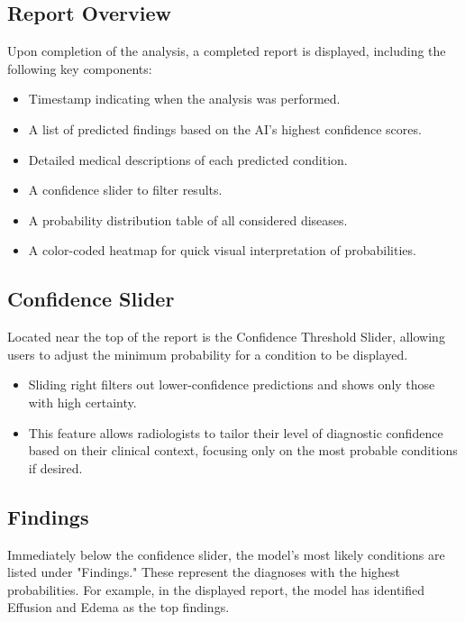 \documentclass[12pt]{article}
\begin{document}
\subsection{Report Overview}

Upon completion of the analysis, a completed report is displayed, including the following key components:

\begin{itemize}
    \item Timestamp indicating when the analysis was performed.
    \item A list of predicted findings based on the AI's highest confidence scores.
    \item Detailed medical descriptions of each predicted condition.
    \item A confidence slider to filter results.
    \item A probability distribution table of all considered diseases.
    \item A color-coded heatmap for quick visual interpretation of probabilities.
\end{itemize}

\subsection{Confidence Slider}

Located near the top of the report is the Confidence Threshold Slider, allowing users to adjust the minimum probability for a condition to be displayed.

\begin{itemize}
    \item Sliding right filters out lower-confidence predictions and shows only those with high certainty.
    \item This feature allows radiologists to tailor their level of diagnostic confidence based on their clinical context, focusing only on the most probable conditions if desired.
\end{itemize}

\subsection{Findings}

Immediately below the confidence slider, the model's most likely conditions are listed under "Findings." These represent the diagnoses with the highest probabilities. For example, in the displayed report, the model has identified Effusion and Edema as the top findings.
\end{document}
